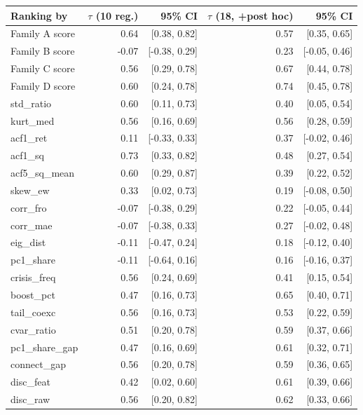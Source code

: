 \begin{tabular}{lrrrr}
\toprule
Ranking by & $\tau$ (10 reg.) & 95\% CI & $\tau$ (18, +post hoc) & 95\% CI \\
\midrule
Family A score & 0.64 & [0.38, 0.82] & 0.57 & [0.35, 0.65] \\
Family B score & -0.07 & [-0.38, 0.29] & 0.23 & [-0.05, 0.46] \\
Family C score & 0.56 & [0.29, 0.78] & 0.67 & [0.44, 0.78] \\
Family D score & 0.60 & [0.24, 0.78] & 0.74 & [0.45, 0.78] \\
std\_ratio & 0.60 & [0.11, 0.73] & 0.40 & [0.05, 0.54] \\
kurt\_med & 0.56 & [0.16, 0.69] & 0.56 & [0.28, 0.59] \\
acf1\_ret & 0.11 & [-0.33, 0.33] & 0.37 & [-0.02, 0.46] \\
acf1\_sq & 0.73 & [0.33, 0.82] & 0.48 & [0.27, 0.54] \\
acf5\_sq\_mean & 0.60 & [0.29, 0.87] & 0.39 & [0.22, 0.52] \\
skew\_ew & 0.33 & [0.02, 0.73] & 0.19 & [-0.08, 0.50] \\
corr\_fro & -0.07 & [-0.38, 0.29] & 0.22 & [-0.05, 0.44] \\
corr\_mae & -0.07 & [-0.38, 0.33] & 0.27 & [-0.02, 0.48] \\
eig\_dist & -0.11 & [-0.47, 0.24] & 0.18 & [-0.12, 0.40] \\
pc1\_share & -0.11 & [-0.64, 0.16] & 0.16 & [-0.16, 0.37] \\
crisis\_freq & 0.56 & [0.24, 0.69] & 0.41 & [0.15, 0.54] \\
boost\_pct & 0.47 & [0.16, 0.73] & 0.65 & [0.40, 0.71] \\
tail\_coexc & 0.56 & [0.16, 0.73] & 0.53 & [0.22, 0.59] \\
cvar\_ratio & 0.51 & [0.20, 0.78] & 0.59 & [0.37, 0.66] \\
pc1\_share\_gap & 0.47 & [0.16, 0.69] & 0.61 & [0.32, 0.71] \\
connect\_gap & 0.56 & [0.20, 0.78] & 0.59 & [0.36, 0.65] \\
disc\_feat & 0.42 & [0.02, 0.60] & 0.61 & [0.39, 0.66] \\
disc\_raw & 0.56 & [0.20, 0.82] & 0.62 & [0.33, 0.66] \\
\bottomrule
\end{tabular}
